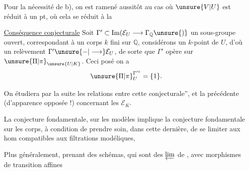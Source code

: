 Pour la nécessité de b), on est ramené aussitôt au cas où $\unsure{V|U}$ est réduit à un pt, où cela se réduit à la 

\uline{Conséquence conjecturale} Soit $\Gamma'\subset\operatorname{Im}(\mathcal E_U\longrightarrow\Gamma_{\mathbb{Q}}\unsure{)}$ un sous-groupe ouvert, correspondant à un corps $k$ fini sur $\mathbb{Q}$, considérons un $k$-point de $U$, d'où un relèvement $\Gamma'\unsure{-|\longrightarrow}\mathcal E_U$, de sorte que $\Gamma'$ opère sur $\unsure{\Pi|\pi}_{\unsure{U|K}}$. Ceci posé\unsure{,} on a
\[
\unsure{\Pi|\pi}_U^{\Gamma'^\circ}=\{1\}.
\]

On étudiera par la suite les relations entre cette  conjecturale'', et la précédente (d'apparence opposée !) concernant les $\mathcal E_K$.

La conjecture fondamentale, sur les modèles implique la conjecture fondamentale sur les corps, à condition de prendre soin, dans cette dernière, de se limiter aux hom compatibles aux filtrations modéliques,

Plus généralement, prenant  des schémas,  qui sont des $\varprojlim$ de   , avec morphismes de transition  affines
